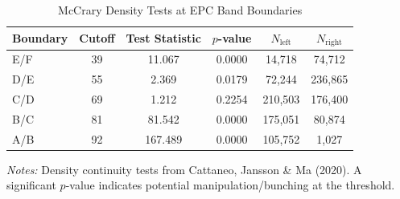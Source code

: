 \begin{table}[htbp]
\centering
\caption{McCrary Density Tests at EPC Band Boundaries}
\label{tab:mccrary}
\begin{tabular}{lccccc}
\toprule
Boundary & Cutoff & Test Statistic & $p$-value & $N_{\text{left}}$ & $N_{\text{right}}$ \\
\midrule
E/F & 39 & 11.067 & 0.0000 & 14,718 & 74,712 \\
D/E & 55 & 2.369 & 0.0179 & 72,244 & 236,865 \\
C/D & 69 & 1.212 & 0.2254 & 210,503 & 176,400 \\
B/C & 81 & 81.542 & 0.0000 & 175,051 & 80,874 \\
A/B & 92 & 167.489 & 0.0000 & 105,752 & 1,027 \\
\bottomrule
\end{tabular}
\begin{minipage}{\textwidth}
\footnotesize
\textit{Notes:} Density continuity tests from Cattaneo, Jansson \& Ma (2020).
A significant $p$-value indicates potential manipulation/bunching at the threshold.
\end{minipage}
\end{table}
